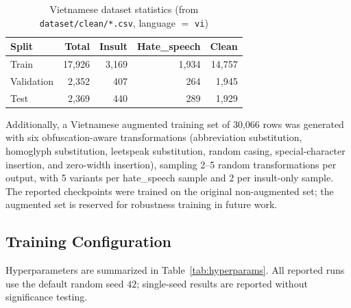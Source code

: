 \documentclass[runningheads]{llncs}
\begin{document}
\begin{table}
\centering\footnotesize
\caption{Vietnamese dataset statistics (from \texttt{dataset/clean/*.csv}, language $=$ \texttt{vi})}\label{tab:dataset}
\begin{tabular}{@{}lrrrr@{}}
\hline
\textbf{Split} & \textbf{Total} & \textbf{Insult} & \textbf{Hate\_speech} & \textbf{Clean} \\
\hline
Train & 17,926 & 3,169 & 1,934 & 14,757 \\
Validation & 2,352 & 407 & 264 & 1,945 \\
Test & 2,369 & 440 & 289 & 1,929 \\
\hline
\end{tabular}
\end{table}

Additionally, a Vietnamese augmented training set of 30,066 rows was generated with six obfuscation-aware transformations (abbreviation substitution, homoglyph substitution, leetspeak substitution, random casing, special-character insertion, and zero-width insertion), sampling 2--5 random transformations per output, with 5 variants per hate\_speech sample and 2 per insult-only sample. The reported checkpoints were trained on the original non-augmented set; the augmented set is reserved for robustness training in future work.

\subsection{Training Configuration}

Hyperparameters are summarized in Table~\ref{tab:hyperparams}. All reported runs use the default random seed $42$; single-seed results are reported without significance testing.
\end{document}

